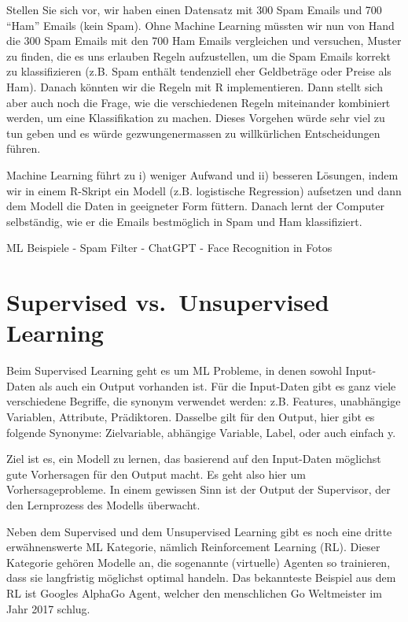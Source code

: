 \documentclass[
]{book}
\begin{document}
Stellen Sie sich vor, wir haben einen Datensatz mit 300 Spam Emails und 700 ``Ham'' Emails (kein Spam). Ohne Machine Learning müssten wir nun von Hand die 300 Spam Emails mit den 700 Ham Emails vergleichen und versuchen, Muster zu finden, die es uns erlauben Regeln aufzustellen, um die Spam Emails korrekt zu klassifizieren (z.B. Spam enthält tendenziell eher Geldbeträge oder Preise als Ham). Danach könnten wir die Regeln mit R implementieren. Dann stellt sich aber auch noch die Frage, wie die verschiedenen Regeln miteinander kombiniert werden, um eine Klassifikation zu machen. Dieses Vorgehen würde sehr viel zu tun geben und es würde gezwungenermassen zu willkürlichen Entscheidungen führen.

Machine Learning führt zu i) weniger Aufwand und ii) besseren Lösungen, indem wir in einem R-Skript ein Modell (z.B. logistische Regression) aufsetzen und dann dem Modell die Daten in geeigneter Form füttern. Danach lernt der Computer selbständig, wie er die Emails bestmöglich in Spam und Ham klassifiziert.

ML Beispiele
- Spam Filter
- ChatGPT
- Face Recognition in Fotos

\hypertarget{supervised-vs.-unsupervised-learning}{%
\section{Supervised vs.~Unsupervised Learning}\label{supervised-vs.-unsupervised-learning}}

Beim Supervised Learning geht es um ML Probleme, in denen sowohl Input-Daten als auch ein Output vorhanden ist. Für die Input-Daten gibt es ganz viele verschiedene Begriffe, die synonym verwendet werden: z.B. Features, unabhängige Variablen, Attribute, Prädiktoren. Dasselbe gilt für den Output, hier gibt es folgende Synonyme: Zielvariable, abhängige Variable, Label, oder auch einfach y.

Ziel ist es, ein Modell zu lernen, das basierend auf den Input-Daten möglichst gute Vorhersagen für den Output macht. Es geht also hier um Vorhersageprobleme. In einem gewissen Sinn ist der Output der Supervisor, der den Lernprozess des Modells überwacht.

Neben dem Supervised und dem Unsupervised Learning gibt es noch eine dritte erwähnenswerte ML Kategorie, nämlich Reinforcement Learning (RL). Dieser Kategorie gehören Modelle an, die sogenannte (virtuelle) Agenten so trainieren, dass sie langfristig möglichst optimal handeln. Das bekannteste Beispiel aus dem RL ist Googles AlphaGo Agent, welcher den menschlichen Go Weltmeister im Jahr 2017 schlug.
\end{document}
